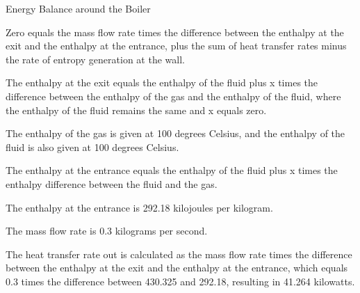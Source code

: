 Energy Balance around the Boiler

Zero equals the mass flow rate times the difference between the enthalpy at the exit and the enthalpy at the entrance, plus the sum of heat transfer rates minus the rate of entropy generation at the wall.

The enthalpy at the exit equals the enthalpy of the fluid plus x times the difference between the enthalpy of the gas and the enthalpy of the fluid, where the enthalpy of the fluid remains the same and x equals zero.

The enthalpy of the gas is given at 100 degrees Celsius, and the enthalpy of the fluid is also given at 100 degrees Celsius.

The enthalpy at the entrance equals the enthalpy of the fluid plus x times the enthalpy difference between the fluid and the gas.

The enthalpy at the entrance is 292.18 kilojoules per kilogram.

The mass flow rate is 0.3 kilograms per second.

The heat transfer rate out is calculated as the mass flow rate times the difference between the enthalpy at the exit and the enthalpy at the entrance, which equals 0.3 times the difference between 430.325 and 292.18, resulting in 41.264 kilowatts.